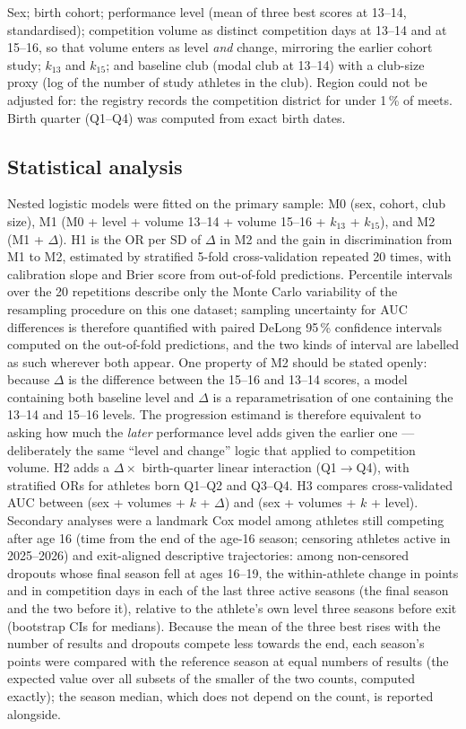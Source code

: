 \documentclass[12pt,a4paper]{article}
\begin{document}
Sex; birth cohort; performance level (mean of three best scores at 13--14, standardised); competition volume as distinct competition days at 13--14 and at 15--16, so that volume enters as level \emph{and} change, mirroring the earlier cohort study; $k_{13}$ and $k_{15}$; and baseline club (modal club at 13--14) with a club-size proxy (log of the number of study athletes in the club). Region could not be adjusted for: the registry records the competition district for under 1\,\% of meets. Birth quarter (Q1--Q4) was computed from exact birth dates.

\subsection{Statistical analysis}

Nested logistic models were fitted on the primary sample: M0 (sex, cohort, club size), M1 (M0 + level + volume 13--14 + volume 15--16 + $k_{13}$ + $k_{15}$), and M2 (M1 + $\Delta$). H1 is the OR per SD of $\Delta$ in M2 and the gain in discrimination from M1 to M2, estimated by stratified 5-fold cross-validation repeated 20 times, with calibration slope and Brier score from out-of-fold predictions. Percentile intervals over the 20 repetitions describe only the Monte Carlo variability of the resampling procedure on this one dataset; sampling uncertainty for AUC differences is therefore quantified with paired DeLong 95\,\% confidence intervals computed on the out-of-fold predictions, and the two kinds of interval are labelled as such wherever both appear. One property of M2 should be stated openly: because $\Delta$ is the difference between the 15--16 and 13--14 scores, a model containing both baseline level and $\Delta$ is a reparametrisation of one containing the 13--14 and 15--16 levels. The progression estimand is therefore equivalent to asking how much the \emph{later} performance level adds given the earlier one --- deliberately the same ``level and change'' logic that \citet{guttormsen2026dropout} applied to competition volume. H2 adds a $\Delta \times$ birth-quarter linear interaction (Q1$\to$Q4), with stratified ORs for athletes born Q1--Q2 and Q3--Q4. H3 compares cross-validated AUC between (sex + volumes + $k$ + $\Delta$) and (sex + volumes + $k$ + level). Secondary analyses were a landmark Cox model among athletes still competing after age 16 (time from the end of the age-16 season; censoring athletes active in 2025--2026) and exit-aligned descriptive trajectories: among non-censored dropouts whose final season fell at ages 16--19, the within-athlete change in points and in competition days in each of the last three active seasons (the final season and the two before it), relative to the athlete's own level three seasons before exit (bootstrap CIs for medians). Because the mean of the three best rises with the number of results and dropouts compete less towards the end, each season's points were compared with the reference season at equal numbers of results (the expected value over all subsets of the smaller of the two counts, computed exactly); the season median, which does not depend on the count, is reported alongside.
\end{document}
